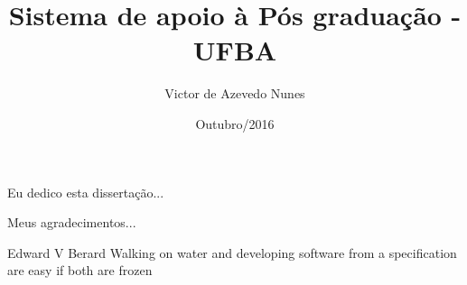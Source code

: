 \documentclass[pt,twoside,onehalfspacing,bsc]{risethesis}
\title{Sistema de apoio à Pós graduação - UFBA}
\date{Outubro/2016}
\author{Victor de Azevedo Nunes}
\begin{document}
\frontmatter
\frontpage
\presentationpage

\begin{dedicatory}
Eu dedico esta dissertação...
\end{dedicatory}

\acknowledgements
Meus agradecimentos...

\begin{epigraph}[]{Edward V Berard}
Walking on water and developing software from a specification are easy if both are frozen
\end{epigraph}

\resumo


\abstract


\tableofcontents

\listoffigures

\listoftables

\listofacronyms



\mainmatter




% 
% 
% 
% 
% 

%


\clearpage
\addappheadtotoc
\appendix
\appendixpage
% 
\end{document}
